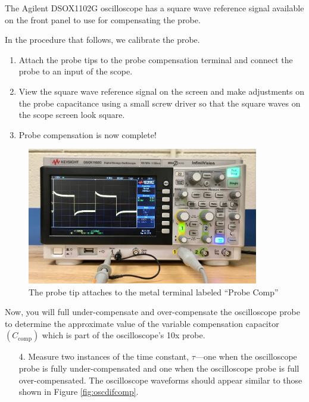 \documentclass[12pt]{../manual}
\begin{document}
The Agilent DSOX1102G oscilloscope has a square wave reference signal available on the front panel to use for compensating the probe.

In the procedure that follows, we calibrate the probe.
\begin{enumerate}
\item Attach the probe tips to the probe compensation terminal and connect the probe to an input of the scope. 
\item View the square wave reference signal on the screen and make adjustments on the probe capacitance using a small screw driver so that the square waves on the scope screen look square.
\item Probe compensation is now complete!
\end{enumerate}

\begin{figure}[ht!]
\begin{center}
\centering
\includegraphics[width=0.9\textwidth]{figures/OscProbeComp.jpeg}
\caption[Oscilloscope Probe Calibration]{The probe tip attaches to the metal terminal labeled ``Probe Comp''}
\label{fig:oscprobecomp}
\end{center}
\end{figure}

Now, you will full under-compensate and over-compensate the oscilloscope probe to determine the approximate value of the variable compensation capacitor $(C_{\mathrm{comp}})$ which is part of the oscilloscope's 10x probe.

\begin{itemize}
\item[4.] Measure two instances of the time constant, $\tau$---one when the oscilloscope probe is fully under-compensated and one when the oscilloscope probe is full over-compensated. The oscilloscope waveforms should appear similar to those shown in Figure \ref{fig:oscdifcomp}.
\end{itemize}
\end{document}

